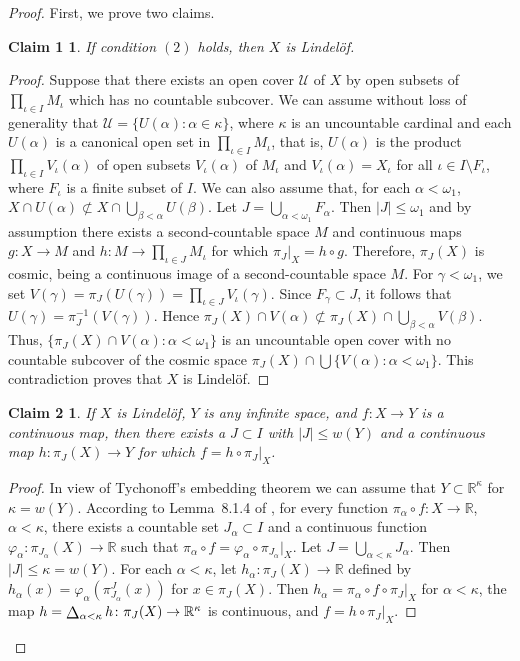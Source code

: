 \documentclass[a4paper,12pt]{amsart}
\newtheorem*{claim-1}{Claim 1}
\newtheorem*{claim-2}{Claim 2}
\theoremstyle{definition}
\theoremstyle{remark}
\def\bigdiag{\operatornamewithlimits{%
  \mathchoice{\vcenter{\hbox{\Large$\Delta$}}}
             {\vcenter{\hbox{\large$\Delta$}}}
             {\Delta}
             {\Delta}}}
\begin{document}
\begin{proof}
First, we prove two claims.

\begin{claim-1} 
If condition $(2)$ holds, then $X$ is Lindel\"of.
\end{claim-1}

\begin{proof}
Suppose that there 
exists an open cover $\mathscr U$ of $X$ by open subsets of $\prod_{\iota\in I}M_\iota$ which has no countable 
subcover. We can assume without loss of generality 
that $\mathscr U=\{U(\alpha): \alpha\in \kappa\}$, where $\kappa$ is an uncountable cardinal and 
each $U(\alpha)$ is a canonical open set in 
$\prod_{\iota\in I}M_\iota$, that is, $U(\alpha)$ is the product $\prod_{\iota\in I}V_\iota(\alpha)$ of 
open subsets $V_\iota(\alpha)$ of $M_\iota$ and $V_\iota(\alpha)=X_\iota$ for all $\iota\in I\setminus 
F_\iota$, where $F_\iota$ is a finite subset of $I$. We can also assume that, for each $\alpha<\omega_1$, 
$X\cap U(\alpha)\not\subset X\cap \bigcup_{\beta<\alpha} U(\beta)$. Let $J=\bigcup_{\alpha<\omega_1}F_\alpha$.
Then $|J|\le \omega_1$ and by assumption there exists a second-countable space 
$M$ and continuous maps $g\colon X\to M$ and $h\colon M\to \prod_{\iota\in J}M_\iota$ 
for which $\pi_J|_{X} = h\circ g$. 
Therefore, $\pi_J(X)$ is cosmic, being a continuous image of a second-countable space $M$. 
For $\gamma<\omega_1$, we set $V(\gamma)=\pi_J(U(\gamma))=\prod_{\iota\in J}V_\iota(\gamma)$.
Since $F_\gamma\subset J$, it follows that $U(\gamma)=\pi_J^{-1}(V(\gamma))$.
Hence $\pi_J(X)\cap V(\alpha)\not\subset \pi_J(X)\cap  \bigcup_{\beta<\alpha}  V(\beta)$. 
Thus, $\{\pi_J(X)\cap V(\alpha): \alpha<\omega_1\}$ is an uncountable open cover with 
no countable subcover of the cosmic space 
$\pi_J(X)\cap \bigcup\{V(\alpha): \alpha<\omega_1\}$. 
This contradiction proves that $X$ is Lindel\"of. 
\end{proof}

\begin{claim-2}
If $X$ is Lindel\"of, $Y$ is any infinite space, and $f\colon X\to Y$ is a continuous map, 
then there exists a $J\subset I$ with $|J|\leq w(Y)$ and a continuous map $h\colon \pi_J(X)\to Y$ 
for which $f=h\circ \pi_J|_X$.
\end{claim-2}

\begin{proof}
In view of Tychonoff's embedding theorem we can assume that $Y\subset {\mathbb R}^\kappa$ for $\kappa=w(Y)$.
According to Lemma~8.1.4 of \cite{A-T}, for
every function $\pi_\alpha\circ f\colon X\to \mathbb R$, $\alpha<\kappa$, there exists a countable set 
$J_\alpha\subset I$ and a continuous function $\varphi_\alpha\colon \pi_{J_\alpha}(X)
\to \mathbb R$ such that $\pi_\alpha\circ f = \varphi_\alpha\circ \pi_{J_\alpha}|_{X}$. 
Let $J=\bigcup_{\alpha< \kappa} J_\alpha$. Then $|J|\le \kappa = w(Y)$. 
For  each $\alpha<\kappa$, let $h_\alpha\colon \pi_J(X)\to \mathbb R$ 
defined by $h_\alpha(x)=\varphi_\alpha(\pi^J_{J_\alpha}(x))$ for $x\in \pi_J(X)$.
Then $h_\alpha=\pi_\alpha\circ f\circ \pi_J|_X$ 
for $\alpha<\kappa$, the map $h=\bigdiag_{\alpha<\kappa}h\colon \pi_J(X)\to {\mathbb R}^\kappa$ 
is continuous, and $f=h\circ \pi_J|_X$.
\end{proof}


\end{proof}
\end{document}
